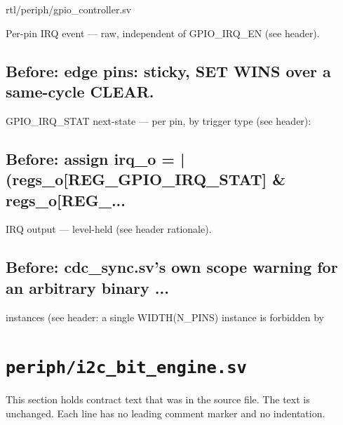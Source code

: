 \begin{relocated}{rtl/periph/gpio_controller.sv}
\begin{textblock}
Per-pin IRQ event — raw, independent of GPIO_IRQ_EN (see header).
\end{textblock}

\subsection*{Before: edge  pins: sticky, SET WINS over a same-cycle CLEAR.}

\begin{textblock}
GPIO_IRQ_STAT next-state — per pin, by trigger type (see header):
\end{textblock}

\subsection*{Before: assign irq\_o = |(regs\_o[REG\_GPIO\_IRQ\_STAT] \& regs\_o[REG\_...}

\begin{textblock}
IRQ output — level-held (see header rationale).
\end{textblock}

\subsection*{Before: cdc\_sync.sv's own scope warning for an arbitrary binary ...}

\begin{textblock}
instances (see header: a single WIDTH(N_PINS) instance is forbidden by
\end{textblock}

\end{relocated}

\section{\texttt{periph/i2c\_bit\_engine.sv}}\label{ds:mod:i2c-bit-engine}

This section holds contract text that was in the source file. The text is unchanged. Each line has no leading comment marker and no indentation.

